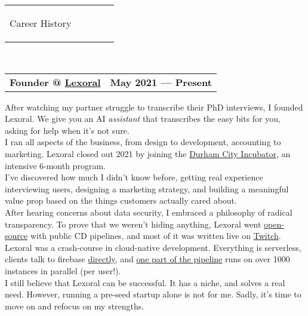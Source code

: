 \documentclass[hidelinks, 12pt, a4paper]{article}
\begin{document}
	\newpage
	
	\begin{tabularx}{\textwidth}{@{}llXrr@{}}
		\begin{Large}Career History\end{Large}&
		\rule{80pt}{1pt}&&&
	\end{tabularx}\\
	
	\begin{tabularx}{\linewidth}{@{}Xr@{}}
		\textbf{Founder @ \href{https://www.lexoral.com/}{Lexoral}} & \textbf{May 2021 --- Present}
	\end{tabularx}\vspace{2pt}

	\begin{multicols}{2}
		After watching my partner struggle to transcribe their PhD interviews, I founded Lexoral.
		We give you an AI \emph{assistant} that transcribes the easy bits for you, asking for help when it's not sure.\\
		
		I ran all aspects of the business, from design to development, accounting to marketing.
		Lexoral closed out 2021 by joining the \href{https://dcincubator.co.uk/}{Durham City Incubator}, an intensive 6-month program.\\
		
		I've discovered how much I didn't know before, getting real experience interviewing users, designing a marketing strategy, and building a meaningful value prop based on the things customers actually cared about.\\
		
		After hearing concerns about data security, I embraced a philosophy of radical transparency.
		To prove that we weren't hiding anything, Lexoral went \href{https://github.com/stevenwaterman/Lexoral/}{open-source} with public CD pipelines, and most of it was written live on \href{https://twitch.tv/lexoral}{Twitch}.\\
		
		Lexoral was a crash-course in cloud-native development.
		Everything is serverless, clients talk to firebase \href{https://lexoral.com/blog/svelte-firestore-binding/}{directly}, and \href{https://twitter.com/SteWaterman/status/1445041856023339011}{one part of the pipeline} runs on over 1000 instances in parallel (per user!).\\
		
		I still believe that Lexoral can be successful.
		It has a niche, and solves a real need.
		However, running a pre-seed startup alone is not for me.
		Sadly, it's time to move on and refocus on my strengths.\\
		
	\end{multicols}
\end{document}
